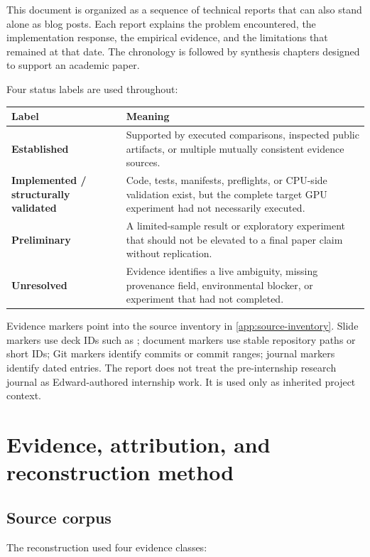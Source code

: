 \documentclass[11pt,oneside]{report}
\newcommand{\code}[1]{\texttt{\detokenize{#1}}}
\newcommand{\statusEstablished}{\textcolor{established}{\textbf{Established}}\xspace}
\newcommand{\statusImplemented}{\textcolor{implemented}{\textbf{Implemented / structurally validated}}\xspace}
\newcommand{\statusPreliminary}{\textcolor{preliminary}{\textbf{Preliminary}}\xspace}
\newcommand{\statusUnresolved}{\textcolor{unresolved}{\textbf{Unresolved}}\xspace}
\begin{document}
This document is organized as a sequence of technical reports that can also stand alone as blog posts. Each report explains the problem encountered, the implementation response, the empirical evidence, and the limitations that remained at that date. The chronology is followed by synthesis chapters designed to support an academic paper.

Four status labels are used throughout:

\begin{longtable}{@{}P{0.20\textwidth}P{0.72\textwidth}@{}}
\toprule
Label & Meaning \\
\midrule
\statusEstablished & Supported by executed comparisons, inspected public artifacts, or multiple mutually consistent evidence sources. \\
\statusImplemented & Code, tests, manifests, preflights, or CPU-side validation exist, but the complete target GPU experiment had not necessarily executed. \\
\statusPreliminary & A limited-sample result or exploratory experiment that should not be elevated to a final paper claim without replication. \\
\statusUnresolved & Evidence identifies a live ambiguity, missing provenance field, environmental blocker, or experiment that had not completed. \\
\bottomrule
\end{longtable}

Evidence markers point into the source inventory in \cref{app:source-inventory}. Slide markers use deck IDs such as \code{S:0602/10}; document markers use stable repository paths or short IDs; Git markers identify commits or commit ranges; journal markers identify dated entries. The report does not treat the pre-internship research journal as Edward-authored internship work. It is used only as inherited project context.

\clearpage
{}

\chapter{Evidence, attribution, and reconstruction method}

\section{Source corpus}

The reconstruction used four evidence classes:
\end{document}
